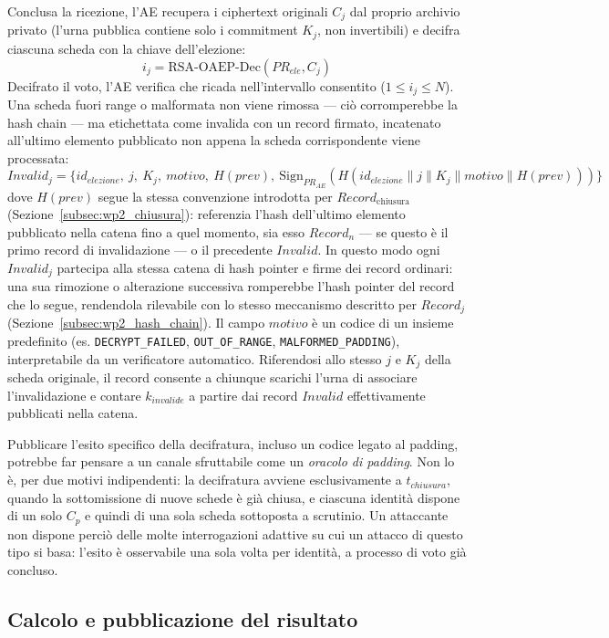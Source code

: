 Conclusa la ricezione, l'AE recupera i ciphertext originali $C_j$ dal proprio archivio privato (l'urna pubblica contiene solo i commitment $K_j$, non invertibili) e decifra ciascuna scheda con la chiave dell'elezione:
$$i_j = \text{RSA-OAEP-Dec}(PR_{ele}, C_j)$$
Decifrato il voto, l'AE verifica che ricada nell'intervallo consentito ($1 \le i_j \le N$). Una scheda fuori range o malformata non viene rimossa --- ciò corromperebbe la hash chain --- ma etichettata come invalida con un record firmato, incatenato all'ultimo elemento pubblicato non appena la scheda corrispondente viene processata:
$$Invalid_j = \{ id_{elezione},\ j,\ K_j,\ motivo,\ H(prev),\ \text{Sign}_{PR_{AE}}(H(id_{elezione} \parallel j \parallel K_j \parallel motivo \parallel H(prev))) \}$$
dove $H(prev)$ segue la stessa convenzione introdotta per $Record_{\text{chiusura}}$ (Sezione~\ref{subsec:wp2_chiusura}): referenzia l'hash dell'ultimo elemento pubblicato nella catena fino a quel momento, sia esso $Record_n$ --- se questo è il primo record di invalidazione --- o il precedente $Invalid$. In questo modo ogni $Invalid_j$ partecipa alla stessa catena di hash pointer e firme dei record ordinari: una sua rimozione o alterazione successiva romperebbe l'hash pointer del record che lo segue, rendendola rilevabile con lo stesso meccanismo descritto per $Record_j$ (Sezione~\ref{subsec:wp2_hash_chain}). Il campo $motivo$ è un codice di un insieme predefinito (es. \texttt{DECRYPT\_FAILED}, \texttt{OUT\_OF\_RANGE}, \texttt{MALFORMED\_PADDING}), interpretabile da un verificatore automatico. Riferendosi allo stesso $j$ e $K_j$ della scheda originale, il record consente a chiunque scarichi l'urna di associare l'invalidazione e contare $k_{invalide}$ a partire dai record $Invalid$ effettivamente pubblicati nella catena.

Pubblicare l'esito specifico della decifratura, incluso un codice legato al padding, potrebbe far pensare a un canale sfruttabile come un \textit{oracolo di padding}. Non lo è, per due motivi indipendenti: la decifratura avviene esclusivamente a $t_{chiusura}$, quando la sottomissione di nuove schede è già chiusa, e ciascuna identità dispone di un solo $C_p$ e quindi di una sola scheda sottoposta a scrutinio. Un attaccante non dispone perciò delle molte interrogazioni adattive su cui un attacco di questo tipo si basa: l'esito è osservabile una sola volta per identità, a processo di voto già concluso.

\subsection{Calcolo e pubblicazione del risultato}
\label{subsec:wp2_calcolo_risultato}

